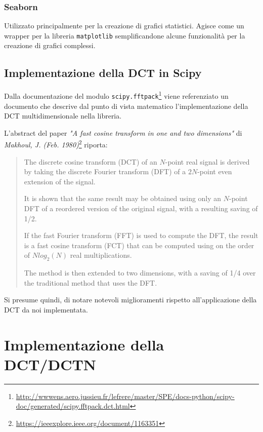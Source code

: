 \documentclass[11pt,italian]{article}
\begin{document}
\subsubsection*{Seaborn}
Utilizzato principalmente per la creazione di grafici statistici. Agisce come un wrapper per la libreria \lstinline{matplotlib} semplificandone alcune funzionalità per la creazione di grafici complessi.

\subsection{Implementazione della DCT in Scipy}
\label{section:scipy-fft}
Dalla documentazione del modulo \lstinline{scipy.fftpack}\footnote{\url{http://wwwens.aero.jussieu.fr/lefrere/master/SPE/docs-python/scipy-doc/generated/scipy.fftpack.dct.html}} viene referenziato un documento che descrive dal punto di vista matematico l'implementazione della DCT multidimensionale nella libreria.

\noindent
L'abstract del paper \textit{"A fast cosine transform in one and two dimensions"} di \textit{Makhoul, J. (Feb. 1980)}\footnote{\url{https://ieeexplore.ieee.org/document/1163351}} riporta:
\begin{quote}
    The discrete cosine transform (DCT) of an $N$-point real signal is derived by taking the discrete Fourier transform (DFT) of a $2N$-point even extension of the signal.

    It is shown that the same result may be obtained using only an $N$-point DFT of a reordered version of the original signal, with a resulting saving of 1/2.

    If the fast Fourier transform (FFT) is used to compute the DFT, the result is a fast cosine transform (FCT) that can be computed using on the order of $N log_2(N)$ real multiplications.

    The method is then extended to two dimensions, with a saving of 1/4 over the traditional method that uses the DFT.
\end{quote}

\noindent
Si presume quindi, di notare notevoli miglioramenti rispetto all'applicazione della DCT da noi implementata.

\newpage
\section{Implementazione della DCT/DCTN}
\end{document}
